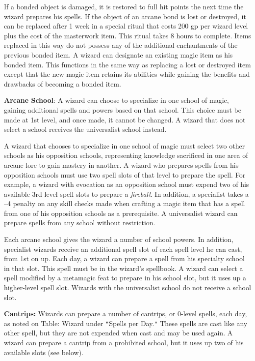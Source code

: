 If a bonded object is damaged, it is restored to full hit points the next time the wizard prepares his spells. If the object of an arcane bond is lost or destroyed, it can be replaced after 1 week in a special ritual that costs 200 gp per wizard level plus the cost of the masterwork item. This ritual takes 8 hours to complete. Items replaced in this way do not possess any of the additional enchantments of the previous bonded item. A wizard can designate an existing magic item as his bonded item. This functions in the same way as replacing a lost or destroyed item except that the new magic item retains its abilities while gaining the benefits and drawbacks of becoming a bonded item.
				
\textbf{Arcane School}: A wizard can choose to specialize in one school of magic, gaining additional spells and powers based on that school. This choice must be made at 1st level, and once made, it cannot be changed. A wizard that does not select a school receives the universalist school instead.
				
A wizard that chooses to specialize in one school of magic must select two other schools as his opposition schools, representing knowledge sacrificed in one area of arcane lore to gain mastery in another. A wizard who prepares spells from his opposition schools must use two spell slots of that level to prepare the spell. For example, a wizard with evocation as an opposition school must expend two of his available 3rd-level spell slots to prepare a \textit{fireball}. In addition, a specialist takes a --4 penalty on any skill checks made when crafting a magic item that has a spell from one of his opposition schools as a prerequisite. A universalist wizard can prepare spells from any school without restriction.
				
Each arcane school gives the wizard a number of school powers. In addition, specialist wizards receive an additional spell slot of each spell level he can cast, from 1st on up. Each day, a wizard can prepare a spell from his specialty school in that slot. This spell must be in the wizard's spellbook. A wizard can select a spell modified by a metamagic feat to prepare in his school slot, but it uses up a higher-level spell slot. Wizards with the universalist school do not receive a school slot.
				
\textbf{Cantrips:} Wizards can prepare a number of cantrips, or 0-level spells, each day, as noted on Table: Wizard under \texttt{{}"{}}Spells per Day.\texttt{{}"{}} These spells are cast like any other spell, but they are not expended when cast and may be used again. A wizard can prepare a cantrip from a prohibited school, but it uses up two of his available slots (see below).
				
